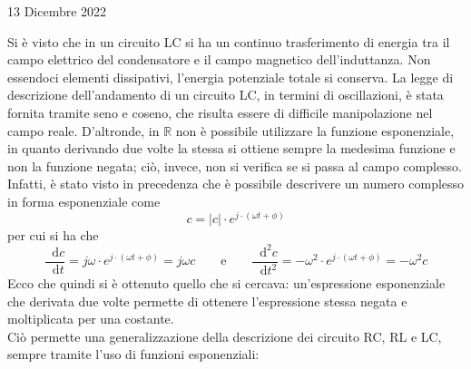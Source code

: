 \documentclass[a4paper]{extarticle}
\newcommand\dif{\mathop{}\!\mathrm{d}}
\begin{document}
\newpage
\noindent
\begin{center}
  13 Dicembre 2022
\end{center}
Si è visto che in un circuito LC si ha un continuo trasferimento di energia tra il campo elettrico del condensatore e il campo magnetico dell'induttanza. Non essendoci elementi dissipativi, l'energia potenziale totale si conserva. La legge di descrizione dell'andamento di un circuito LC, in termini di oscillazioni, è stata fornita tramite seno e coseno, che risulta essere di difficile manipolazione nel campo reale. D'altronde, in $\mathbb{R}$ non è possibile utilizzare la funzione esponenziale, in quanto derivando due volte la stessa si ottiene sempre la medesima funzione e non la funzione negata; ciò, invece, non si verifica se si passa al campo complesso.\\
Infatti, è stato visto in precedenza che è possibile descrivere un numero complesso in forma esponenziale come
\[c = \vert c\vert \cdot e^{j \cdot (\omega t + \phi)}\]
per cui si ha che
\[\dfrac{\dif c}{\dif t} = j \omega \cdot e^{j \cdot (\omega t + \phi)} = j \omega c \hspace{2em} \text{e} \hspace{2em} \dfrac{\dif^2 c}{\dif t^2} = -\omega^2 \cdot e^{j \cdot (\omega t + \phi)} = -\omega^2 c\]
Ecco che quindi si è ottenuto quello che si cercava: un'espressione esponenziale che derivata due volte permette di ottenere l'espressione stessa negata e moltiplicata per una costante.\\
Ciò permette una generalizzazione della descrizione dei circuito RC, RL e LC, sempre tramite l'uso di funzioni esponenziali:
\end{document}
